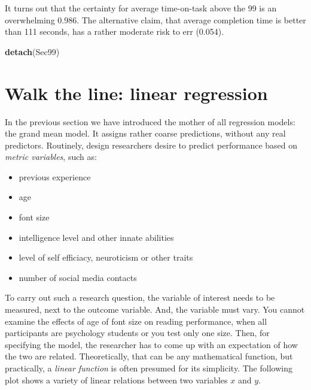 \documentclass[]{svmono}
\newenvironment{Shaded}{\begin{snugshade}}{\end{snugshade}}
\newcommand{\KeywordTok}[1]{\textcolor[rgb]{0.13,0.29,0.53}{\textbf{#1}}}
\newcommand{\NormalTok}[1]{#1}
\providecommand{\tightlist}{%
  \setlength{\itemsep}{0pt}\setlength{\parskip}{0pt}}
\theoremstyle{definition}
\theoremstyle{definition}
\theoremstyle{definition}
\theoremstyle{remark}
\begin{document}
It turns out that the certainty for average time-on-task above the 99 is
an overwhelming 0.986. The alternative claim, that average completion
time is better than 111 seconds, has a rather moderate risk to err
(0.054).

\begin{Shaded}
\begin{Highlighting}[]
\KeywordTok{detach}\NormalTok{(Sec99)}
\end{Highlighting}
\end{Shaded}

\section{Walk the line: linear regression}\label{linear-regression}

In the previous section we have introduced the mother of all regression
models: the grand mean model. It assigns rather coarse predictions,
without any real predictors. Routinely, design researchers desire to
predict performance based on \emph{metric variables}, such as:

\begin{itemize}
\tightlist
\item
  previous experience
\item
  age
\item
  font size
\item
  intelligence level and other innate abilities
\item
  level of self efficiacy, neuroticism or other traits
\item
  number of social media contacts
\end{itemize}

To carry out such a research question, the variable of interest needs to
be measured, next to the outcome variable. And, the variable must vary.
You cannot examine the effects of age of font size on reading
performance, when all participants are psychology students or you test
only one size. Then, for specifying the model, the researcher has to
come up with an expectation of how the two are related. Theoretically,
that can be any mathematical function, but practically, a \emph{linear
function} is often presumed for its simplicity. The following plot shows
a variety of linear relations between two variables \(x\) and \(y\).
\end{document}
